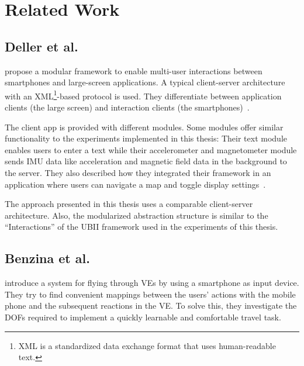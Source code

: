 \chapter{Related Work}\label{chapter:related-work}


\section{Deller et al.}\label{section:deller-2011}
\citeauthor{Deller.2011} propose a modular framework to enable multi-user interactions between smartphones and large-screen applications. A typical client-server architecture with an XML\footnote{XML is a standardized data exchange format that uses human-readable text.}-based protocol is used. They differentiate between application clients (the large screen) and interaction clients (the smartphones)~\cite{Deller.2011}.

The client app is provided with different modules. Some modules offer similar functionality to the experiments implemented in this thesis: Their text module enables users to enter a text while their accelerometer and magnetometer module sends \gls{IMU} data like acceleration and magnetic field data in the background to the server. They also described how they integrated their framework in an application where users can navigate a map and toggle display settings~\cite{Deller.2011}.

The approach presented in this thesis uses a comparable client-server architecture. Also, the modularized abstraction structure is similar to the \enquote{Interactions} of the \gls{UBII} framework used in the experiments of this thesis.


\section{Benzina et al.}\label{section:benzina-2011}
\citeauthor{Benzina.2011} introduce a system for flying through \glspl{VE} by using a smartphone as input device.
They try to find convenient mappings between the users' actions with the mobile phone and the subsequent reactions in the \gls{VE}. To solve this, they investigate the \glspl{DOF} required to implement a quickly learnable and comfortable travel task.

